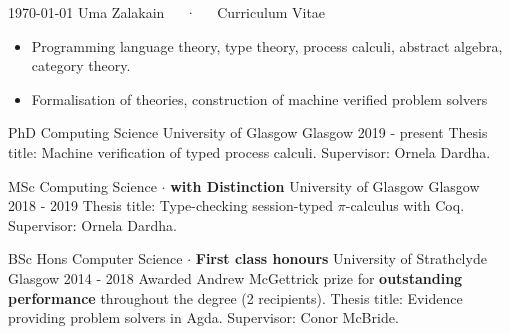 \documentclass[11pt, a4paper]{awesome-cv}
\begin{document}
\makecvheader

\makecvfooter
  {\today}
  {Uma Zalakain~~~·~~~Curriculum Vitae}
  {\thepage}



\begin{itemize}[noitemsep,wide=0pt]
    \item {Programming language theory, type theory, process calculi, abstract
        algebra, category theory.}
    \item {Formalisation of theories, construction of machine verified
        problem solvers}
\end{itemize}


\begin{cventries}
    \cventry
      {PhD Computing Science} %
      {University of Glasgow} %
      {Glasgow} %
      {2019 - present} %
      {
          Thesis title: Machine verification of typed process calculi.\newline
          Supervisor: Ornela Dardha.\newline
      }

    \cventry
      {MSc Computing Science $\cdot$ \textbf{with Distinction}} %
      {University of Glasgow} %
      {Glasgow} %
      {2018 - 2019} %
      {
          Thesis title: Type-checking session-typed $\pi$-calculus with Coq.\newline
          Supervisor: Ornela Dardha.\newline
      }

    \cventry
      {BSc Hons Computer Science $\cdot$ \textbf{First class honours}} %
      {University of Strathclyde} %
      {Glasgow} %
      {2014 - 2018} %
      {
          Awarded Andrew McGettrick prize for \textbf{outstanding performance}
          throughout the degree (2 recipients).\newline
          Thesis title: Evidence providing problem solvers in Agda.\newline
          Supervisor: Conor McBride.\newline
      }
\end{cventries}
\end{document}
